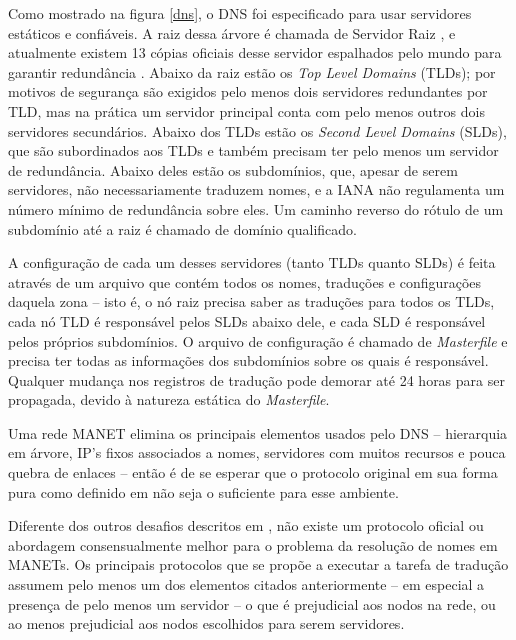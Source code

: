 Como mostrado na figura \ref{dns}, o DNS foi especificado para usar servidores
estáticos e confiáveis. A raiz dessa árvore é chamada de Servidor Raiz
\cite{rfc1035}, e atualmente existem 13 cópias oficiais desse servidor espalhados
pelo mundo para garantir redundância \cite{iana}. Abaixo da raiz estão os
\textit{Top Level Domains} (TLDs); por motivos de segurança são exigidos pelo
menos dois servidores redundantes por TLD, mas na prática um servidor principal
conta com pelo menos outros dois servidores secundários. Abaixo dos TLDs estão
os \textit{Second Level Domains} (SLDs), que são subordinados aos TLDs e também
precisam ter pelo menos um servidor de redundância. Abaixo deles estão os subdomínios,
que, apesar de serem servidores, não necessariamente traduzem nomes, e a IANA não
regulamenta um número mínimo de redundância sobre eles. Um caminho reverso do
rótulo de um subdomínio até a raiz é chamado de domínio qualificado.

A configuração de cada um desses servidores (tanto TLDs quanto SLDs) é feita através de
um arquivo que contém todos os nomes, traduções e configurações daquela zona -- 
isto é, o nó raiz precisa saber as traduções para todos os TLDs, cada nó
TLD é responsável pelos SLDs abaixo dele, e cada SLD é responsável pelos próprios
subdomínios. O arquivo de configuração é chamado de \textit{Masterfile} e precisa
ter todas as informações dos subdomínios sobre os quais é responsável. Qualquer
mudança nos registros de tradução pode demorar até 24 horas para ser propagada,
devido à natureza estática do \textit{Masterfile}.

Uma rede MANET elimina os principais elementos usados pelo DNS -- hierarquia em
árvore, IP's fixos associados a nomes, servidores com muitos recursos e pouca
quebra de enlaces -- então é de se esperar que o protocolo original em sua forma
pura como definido em \cite{rfc1035} não seja o suficiente para esse ambiente.

Diferente dos outros desafios descritos em \cite{manet-state}, não existe um
protocolo oficial ou abordagem consensualmente melhor para o problema da
resolução de nomes em MANETs. Os principais protocolos que se propõe a executar
a tarefa de tradução assumem pelo menos um dos elementos citados anteriormente -- em
especial a presença de pelo menos um servidor -- o que é prejudicial aos nodos
na rede, ou ao menos prejudicial aos nodos escolhidos para serem servidores.

